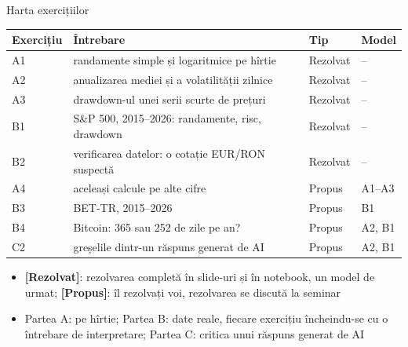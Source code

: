 \begin{frame}{Harta exercițiilor}
\itemsize{\footnotesize}
\begin{center}
\footnotesize
\begin{tabular}{l>{\raggedright\arraybackslash}p{6.4cm}ll}
\toprule
\textbf{Exercițiu} & \textbf{Întrebare} & \textbf{Tip} & \textbf{Model} \\
\midrule
A1 & randamente simple și logaritmice pe hîrtie & Rezolvat & -- \\
A2 & anualizarea mediei și a volatilității zilnice & Rezolvat & -- \\
A3 & drawdown-ul unei serii scurte de prețuri & Rezolvat & -- \\
B1 & S\&P 500, 2015--2026: randamente, risc, drawdown & Rezolvat & -- \\
B2 & verificarea datelor: o cotație EUR/RON suspectă & Rezolvat & -- \\
A4 & aceleași calcule pe alte cifre & Propus & A1--A3 \\
B3 & BET-TR, 2015--2026 & Propus & B1 \\
B4 & Bitcoin: 365 sau 252 de zile pe an? & Propus & A2, B1 \\
C2 & greșelile dintr-un răspuns generat de AI & Propus & A2, B1 \\
\bottomrule
\end{tabular}
\end{center}
\begin{itemize}
    \item \textbf{[Rezolvat]}: rezolvarea completă în slide-uri și în notebook, un model de urmat; \textbf{[Propus]}: îl rezolvați voi, rezolvarea se discută la seminar
    \item Partea A: pe hîrtie; Partea B: date reale, fiecare exercițiu încheindu-se cu o întrebare de interpretare; Partea C: critica unui răspuns generat de AI
\end{itemize}
\end{frame}

